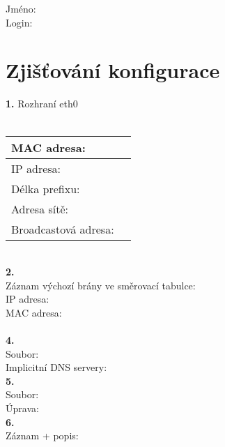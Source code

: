 Jméno:\\
Login:\\

\section{Zjišťování konfigurace}
\textbf{1.} Rozhraní eth0\\
\\
\begin{tabular}{|l|r|}
\hline
MAC adresa: & \hspace{12em} \\
\hline
IP adresa: & \hspace{12em} \\
\hline
Délka prefixu: & \\
\hline
Adresa sítě: & \\
\hline
Broadcastová adresa: & \\
\hline
\end{tabular}
\vspace{1.5em}
\\
\textbf{2.}\\
\vspace{3em}
Záznam výchozí brány ve směrovací tabulce:\\
IP adresa:\\
MAC adresa:\\
\\
\textbf{4.}\\
Soubor:\\
\vspace{8em}
Implicitní DNS servery:\\
\textbf{5.}\\
Soubor:\\
\vspace{4em}
Úprava:\\
\noindent
\textbf{6.}\\
\vspace{5em}
Záznam + popis:\\
\noindent

